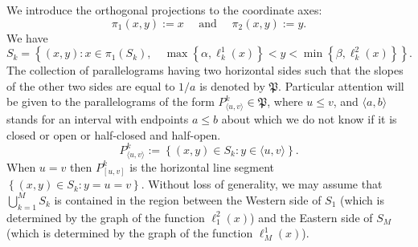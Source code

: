 \documentclass[amssymb,amsfonts,12pt,verbatim,righttag,oneside]{amsart}
\numberwithin{equation}{section} %
\theoremstyle{plain}
\theoremstyle{plain}
\begin{document}
We introduce the orthogonal projections to the coordinate axes:
$$
\pi _1(x,y):=x \quad \text{ and } \quad \pi _2(x,y):=y.
$$
We have
\begin{equation}
\label{z78}
S_k=
\left\{
(x,y): x\in \pi _1(S_k),\quad
\max\left\{ \alpha ,
\ell_k^1(x) \right\}
< y <
\min\left\{
\beta ,
\ell _k^2(x)
 \right\}
 \right\}.
\end{equation}
The collection of parallelograms having two horizontal sides such that the slopes of the other two sides are equal to $1/a$ is denoted by $\mathfrak{P}$.
 Particular attention will be given to the  parallelograms of the form $P_{\langle u,v\rangle}^k\in \mathfrak{P}$, where $u\leq v$,  and
 $\langle a,b\rangle$ stands for an interval with endpoints $a\leq b$ about which we do not know if it is closed or open or half-closed and half-open.
\begin{equation}
\label{z77}
P_{\langle u,v\rangle}^k:=\left\{ (x,y)\in S_k: y\in\langle u,v\rangle  \right\}.
\end{equation}
When $u=v$ then $P_{[ u,v]}^k$ is the horizontal line segment $\left\{ (x,y)\in S_k: y=u=v \right\}$.
 Without loss of generality, we may assume  that $\bigcup\limits _{k=1}^{M}S_k$ is contained in the region between
the Western side of $S_1$ (which is determined by the graph of the function
$\ell  _{1}^{2}(x)$)
 and the Eastern side of $S_M$ (which is determined by the graph of the function $\ell _{M}^{1}(x)$).
\end{document}
